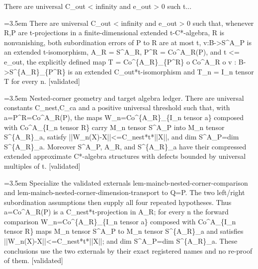 \documentclass{article}
\newcommand{\step}[1]{\par\noindent\hangindent=3.5em\hangafter=1%
  \makebox[3.5em][l]{\textbf{#1.}}}
\newcommand{\steptag}[1]{\hfill{\small\textsf{[#1]}}}
\begin{document}
\begin{proofbox}{There are universal C\_out < infinity and e\_out > 0 such t...}
\step{1} There are universal C\_out < infinity and e\_out > 0 such that, whenever R,P are t-projections in a finite-dimensional extended t-C*-algebra, R is nonvanishing, both subordination errors of P to R are at most t, v:B->S\textasciicircum{}A\_P is an extended t-isomorphism, A\_R = S\textasciicircum{}A\_R, P\textasciicircum{}R = Co\textasciicircum{}A\_R(P), and t <= e\_out, the explicitly defined map T = Co\textasciicircum{}\{A\_R\}\_\{P\textasciicircum{}R\} o Co\textasciicircum{}A\_R o v : B->S\textasciicircum{}\{A\_R\}\_\{P\textasciicircum{}R\} is an extended C\_out*t-isomorphism and T\_n = I\_n tensor T for every n. \steptag{validated} \\[6pt]
\step{1.1} Nested-corner geometry and target algebra ledger. There are universal constants C\_nest,C\_ca and a positive universal threshold such that, with a=P\textasciicircum{}R=Co\textasciicircum{}A\_R(P), the maps W\_n=Co\textasciicircum{}\{A\_R\}\_\{I\_n tensor a\} composed with Co\textasciicircum{}A\_\{I\_n tensor R\} carry M\_n tensor S\textasciicircum{}A\_P into M\_n tensor S\textasciicircum{}\{A\_R\}\_a, satisfy ||W\_n(X)-X||<=C\_nest*t*||X||, and dim S\textasciicircum{}A\_P=dim S\textasciicircum{}\{A\_R\}\_a. Moreover S\textasciicircum{}A\_P, A\_R, and S\textasciicircum{}\{A\_R\}\_a have their compressed extended approximate C*-algebra structures with defects bounded by universal multiples of t. \steptag{validated} \\[6pt]
\step{1.1.1} Specialize the validated externals lem-maincb-nested-corner-comparison and lem-maincb-nested-corner-dimension-transport to Q=P. The two left/right subordination assumptions then supply all four repeated hypotheses. Thus a=Co\textasciicircum{}A\_R(P) is a C\_nest*t-projection in A\_R; for every n the forward comparison W\_n=Co\textasciicircum{}\{A\_R\}\_\{I\_n tensor a\} composed with Co\textasciicircum{}A\_\{I\_n tensor R\} maps M\_n tensor S\textasciicircum{}A\_P to M\_n tensor S\textasciicircum{}\{A\_R\}\_a and satisfies ||W\_n(X)-X||<=C\_nest*t*||X||; and dim S\textasciicircum{}A\_P=dim S\textasciicircum{}\{A\_R\}\_a. These conclusions use the two externals by their exact registered names and no re-proof of them. \steptag{validated} \\[4pt]

\end{proofbox}
\end{document}
